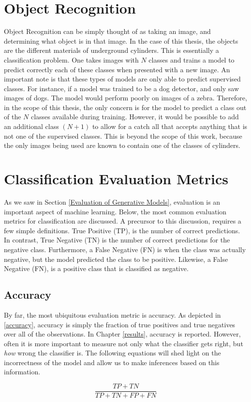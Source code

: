 \section{Object Recognition}
\hspace{0.5in}Object Recognition can be simply thought of as taking an image, and determining what object is in that image. In the case of this thesis, the objects are the different materials of underground cylinders. This is essentially a classification problem. One takes images with $N$ classes and trains a model to predict correctly each of these classes when presented with a new image. An important note is that these types of models are only able to predict supervised classes. For instance, if a model was trained to be a dog detector, and only saw images of dogs. The model would perform poorly on images of a zebra. Therefore, in the scope of this thesis, the only concern is for the model to predict a class out of the $N$ classes available during training. However, it would be possible to add an additional class $(N+1)$ to allow for a catch all that accepts anything that is not one of the supervised classes. This is beyond the scope of this work, because the only images being used are known to contain one of the classes of cylinders.


\section{Classification Evaluation Metrics}
\hspace{0.5in}As we saw in Section \ref{Evaluation of Generative Models}, evaluation is an important aspect of machine learning. Below, the most common evaluation metrics for classification are discussed. A precursor to this discussion, requires a few simple definitions. True Positive (TP), is the number of correct predictions. In contrast, True Negative (TN) is the number of correct predictions for the negative class. Furthermore, a False Negative (FN) is when the class was actually negative, but the model predicted the class to be positive. Likewise, a False Negative (FN), is a positive class that is classified as negative.

\subsection{Accuracy}
\hspace{0.5in}By far, the most ubiquitous evaluation metric is accuracy. As depicted in \ref{accuracy}, accuracy is simply the fraction of true positives and true negatives over all of the observations. In Chapter \ref{results}, accuracy is reported. However, often it is more important to measure not only what the classifier gets right, but \textit{how} wrong the classifier is. The following equations will shed light on the incorrectness of the model and allow us to make inferences based on this information.
\begin{center}
    \begin{equation}
    \label{accuracy}
        \frac{TP+TN}{TP+TN+FP+FN}
    \end{equation}
\end{center}



